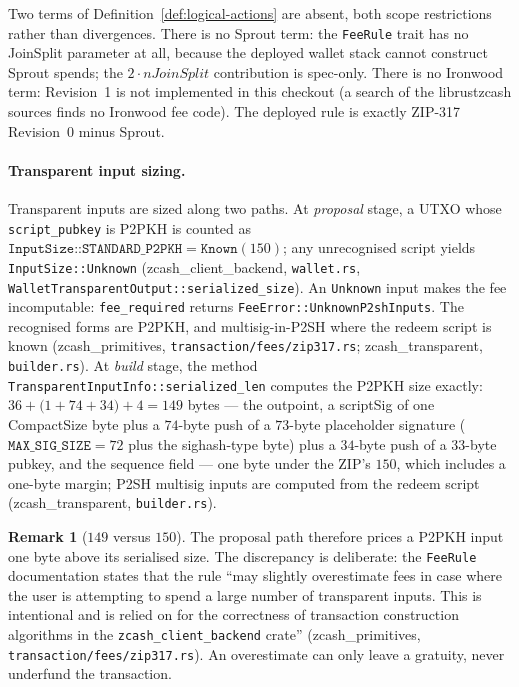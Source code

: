 \documentclass[11pt,a4paper]{article}
\theoremstyle{definition}
\newtheorem{remark}[theorem]{Remark}
\begin{document}
Two terms of Definition~\ref{def:logical-actions} are absent, both scope
restrictions rather than divergences. There is no Sprout term: the
\texttt{FeeRule} trait has no JoinSplit parameter at all, because the
deployed wallet stack cannot construct Sprout spends; the
$2 \cdot \mathit{nJoinSplit}$ contribution is spec-only. There is no
Ironwood term: Revision~1 is not implemented in this checkout (a search of
the \textsf{librustzcash} sources finds no Ironwood fee code). The deployed
rule is exactly ZIP-317 Revision~0 minus Sprout.

\paragraph{Transparent input sizing.} Transparent inputs are sized along
two paths. At \emph{proposal} stage, a UTXO whose \texttt{script\_pubkey}
is P2PKH is counted as
$\texttt{InputSize::STANDARD\_P2PKH} = \texttt{Known}(150)$; any
unrecognised script yields \texttt{InputSize::Unknown}
(\textsf{zcash\_client\_backend}, \texttt{wallet.rs},
\texttt{WalletTransparentOutput::serialized\_size}). An \texttt{Unknown}
input makes the fee incomputable: \texttt{fee\_required} returns
\texttt{FeeError::UnknownP2shInputs}. The recognised forms are P2PKH, and
multisig-in-P2SH where the redeem script is known
(\textsf{zcash\_primitives}, \texttt{transaction/fees/zip317.rs};
\textsf{zcash\_transparent}, \texttt{builder.rs}). At \emph{build} stage,
the method \texttt{TransparentInputInfo::serialized\_len} computes the
P2PKH size exactly:
$36 + \bigl(1 + 74 + 34\bigr) + 4 = 149$ bytes --- the outpoint, a
scriptSig of one CompactSize byte plus a $74$-byte push of a $73$-byte
placeholder signature ($\texttt{MAX\_SIG\_SIZE} = 72$ plus the sighash-type
byte) plus a $34$-byte push of a $33$-byte pubkey, and the sequence field
--- one byte under the ZIP's $150$, which includes a one-byte margin;
P2SH multisig inputs are computed from the redeem script
(\textsf{zcash\_transparent}, \texttt{builder.rs}).

\begin{remark}[$149$ versus $150$]\label{rem:p2pkh-149}
The proposal path therefore prices a P2PKH input one byte above its
serialised size. The discrepancy is deliberate: the \texttt{FeeRule}
documentation states that the rule ``may slightly overestimate fees in
case where the user is attempting to spend a large number of transparent
inputs. This is intentional and is relied on for the correctness of
transaction construction algorithms in the
\texttt{zcash\_client\_backend} crate''
(\textsf{zcash\_primitives}, \texttt{transaction/fees/zip317.rs}). An
overestimate can only leave a gratuity, never underfund the transaction.
\end{remark}
\end{document}
